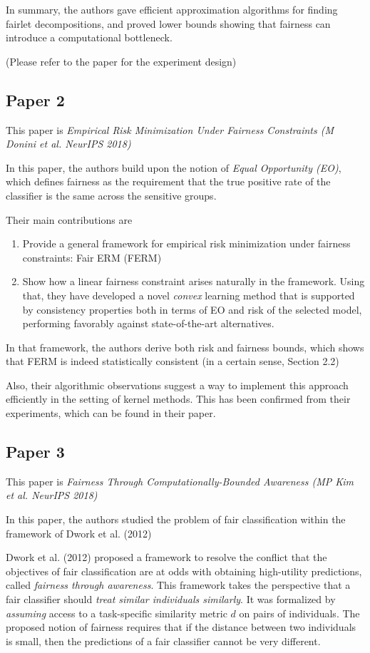 \documentclass{article}
\begin{document}
In summary, the authors gave efficient approximation algorithms for finding fairlet decompositions, and proved lower bounds showing that fairness can introduce a computational bottleneck.

(Please refer to the paper for the experiment design)


\subsection{Paper 2}
This paper is \textit{Empirical Risk Minimization Under Fairness Constraints (M Donini et al. NeurIPS 2018)} 

In this paper, the authors build upon the notion of \textit{Equal Opportunity (EO)}, which defines fairness as the requirement that the true positive rate of the classifier is the same across the sensitive groups.

Their main contributions are
\begin{enumerate}
\item Provide a general framework for empirical risk minimization under fairness constraints: Fair ERM (FERM)
\item Show how a linear fairness constraint arises naturally in the framework. Using that, they have developed a novel \textit{convex} learning method that is supported by consistency properties both in terms of EO and risk of the selected model, performing favorably against state-of-the-art alternatives.
\end{enumerate}

In that framework, the authors derive both risk and fairness bounds, which shows that FERM is indeed statistically consistent (in a certain sense, Section 2.2)

Also, their algorithmic observations suggest a way to implement this approach efficiently in the setting of kernel methods. This has been confirmed from their experiments, which can be found in their paper.

\subsection{Paper 3}
This paper is \textit{Fairness Through Computationally-Bounded Awareness (MP Kim et al. NeurIPS 2018)}

In this paper, the authors studied the problem of fair classification within the framework of Dwork et al. (2012)

Dwork et al. (2012) proposed a framework to resolve the conflict that the objectives of fair classification are at odds with obtaining high-utility predictions, called \textit{fairness through awareness}.
This framework takes the perspective that a fair classifier should \textit{treat similar individuals similarly}.
It was formalized by \textit{assuming} access to a task-specific similarity metric $d$ on pairs of individuals.
The proposed notion of fairness requires that if the distance between two individuals is small, then the predictions of a fair classifier cannot be very different.
\end{document}

